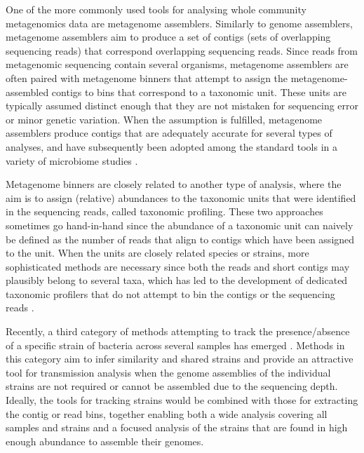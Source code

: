 \documentclass[officiallayout]{tktla}
\begin{document}
One of the more commonly used tools for analysing whole community metagenomics
data are metagenome assemblers. Similarly to genome assemblers,
metagenome assemblers aim to produce a set of contigs (sets of
overlapping sequencing reads) that correspond overlapping sequencing
reads. Since reads from metagenomic sequencing contain several
organisms, metagenome assemblers are often paired with metagenome
binners that attempt to assign the metagenome-assembled contigs to
bins that correspond to a taxonomic unit. These units are typically
assumed distinct enough that they are not mistaken for sequencing
error or minor genetic variation. When the assumption is fulfilled,
metagenome assemblers produce contigs that are adequately accurate for
several types of analyses, and have subsequently been adopted among
the standard tools in a variety of microbiome studies
\citep{bertrand2019hybrid, somerville2019long, stewart2019compendium}.

Metagenome binners are closely related to another type of analysis,
where the aim is to assign (relative) abundances to the taxonomic
units that were identified in the sequencing reads, called taxonomic
profiling. These two approaches sometimes go hand-in-hand since the
abundance of a taxonomic unit can naively be defined as the number of
reads that align to contigs which have been assigned to the unit. When
the units are closely related species or strains, more sophisticated
methods are necessary since both the reads and short contigs may
plausibly belong to several taxa, which has led to the development of
dedicated taxonomic profilers that do not attempt to bin the contigs
or the sequencing reads \citep{beghini2021integrating,
  truong2017microbial, maklin_high-resolution_2021, van2022strainge}.

Recently, a third category of methods attempting to track the
presence/absence of a specific strain of bacteria across several
samples has emerged \citep{van2022strainge, truong2017microbial,
  nayfach2016integrated}. Methods in this category aim to infer
similarity and shared strains and provide an attractive tool for
transmission analysis when the genome assemblies of the individual
strains are not required or cannot be assembled due to the sequencing
depth. Ideally, the tools for tracking strains would be combined with
those for extracting the contig or read bins, together enabling both a
wide analysis covering all samples and strains and a focused analysis
of the strains that are found in high enough abundance to assemble
their genomes.
\end{document}
